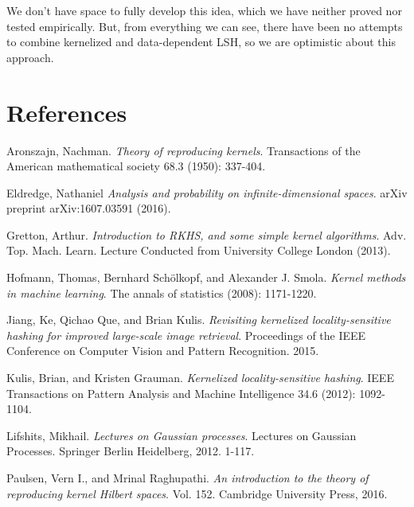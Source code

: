\documentclass[twoside,11pt]{homework}
\begin{document}
We don't have space to fully develop this idea, which we have neither
proved nor tested empirically.  But, from everything we can see, there
have been no attempts to combine kernelized and data-dependent LSH, so
we are optimistic about this approach.

\section{References}
\beginrefs

 Aronszajn, Nachman. \emph{Theory of reproducing kernels}. Transactions of the American mathematical society 68.3 (1950): 337-404.

 Eldredge, Nathaniel \emph{Analysis and probability on infinite-dimensional spaces}. arXiv preprint arXiv:1607.03591 (2016).

 Gretton, Arthur. \emph{Introduction to RKHS, and some simple kernel algorithms}. Adv. Top. Mach. Learn. Lecture Conducted from University College London (2013).

 Hofmann, Thomas, Bernhard Schölkopf, and Alexander J. Smola. \emph{Kernel methods in machine learning}. The annals of statistics (2008): 1171-1220.

 Jiang, Ke, Qichao Que, and Brian Kulis. \emph{Revisiting kernelized locality-sensitive hashing for improved large-scale image retrieval}. Proceedings of the IEEE Conference on Computer Vision and Pattern Recognition. 2015.
  
 Kulis, Brian, and Kristen Grauman. \emph{Kernelized locality-sensitive hashing}. IEEE Transactions on Pattern Analysis and Machine Intelligence 34.6 (2012): 1092-1104.

 Lifshits, Mikhail. \emph{Lectures on Gaussian processes}. Lectures on Gaussian Processes. Springer Berlin Heidelberg, 2012. 1-117.

 Paulsen, Vern I., and Mrinal Raghupathi. \emph{An introduction to the theory of reproducing kernel Hilbert spaces}. Vol. 152. Cambridge University Press, 2016. 


\endrefs
\end{document}
